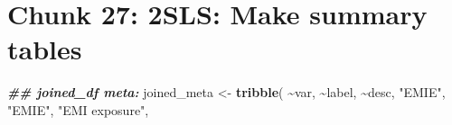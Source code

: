 \documentclass[
]{article}
\newenvironment{Shaded}{\begin{snugshade}}{\end{snugshade}}
\newcommand{\DocumentationTok}[1]{\textcolor[rgb]{0.56,0.35,0.01}{\textbf{\textit{#1}}}}
\newcommand{\FunctionTok}[1]{\textcolor[rgb]{0.13,0.29,0.53}{\textbf{#1}}}
\newcommand{\NormalTok}[1]{#1}
\newcommand{\OtherTok}[1]{\textcolor[rgb]{0.56,0.35,0.01}{#1}}
\newcommand{\SpecialCharTok}[1]{\textcolor[rgb]{0.81,0.36,0.00}{\textbf{#1}}}
\newcommand{\StringTok}[1]{\textcolor[rgb]{0.31,0.60,0.02}{#1}}
\begin{document}
\section*{Chunk 27: 2SLS: Make summary tables}\label{chunk-27-2sls-make-summary-tables}

\begin{Shaded}
\begin{Highlighting}[]
\DocumentationTok{\#\# joined\_df meta:}
\NormalTok{joined\_meta }\OtherTok{\textless{}{-}} \FunctionTok{tribble}\NormalTok{(}
  \SpecialCharTok{\textasciitilde{}}\NormalTok{var, }\SpecialCharTok{\textasciitilde{}}\NormalTok{label, }\SpecialCharTok{\textasciitilde{}}\NormalTok{desc,}
  \StringTok{"EMIE"}\NormalTok{, }\StringTok{"EMIE"}\NormalTok{, }\StringTok{"EMI exposure"}\NormalTok{,}
  

\end{Highlighting}
\end{Shaded}
\end{document}
